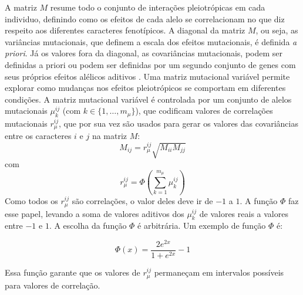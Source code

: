 A matriz $M$ resume todo o conjunto de interações pleiotrópicas em cada
individuo, definindo como os efeitos de cada alelo se correlacionam no
que diz respeito aos diferentes caracteres fenotípicos.
A diagonal da matriz $M$, ou seja, as variâncias mutacionais, que
definem a escala dos efeitos mutacionais, é definida {\it a priori}.
Já os valores fora da diagonal, as covariâncias mutacionais, podem ser
definidas a priori \citep{Jones2003, Jones2004} ou podem ser definidas
por um segundo conjunto de genes com seus próprios efeitos alélicos
aditivos \citep{Jones2007}.
Uma matriz mutacional variável permite explorar como mudanças nos
efeitos pleiotrópicos se comportam em diferentes condições.
A matriz mutacional variável é controlada por um conjunto de alelos mutacionais
$\mu^{ij}_k$ (com $k \in \{1,\ldots,m_\mu\}$), que codificam valores de
correlações mutacionais $r_\mu^{ij}$, que por sua vez são usados para gerar
os valores das covariâncias entre os caracteres $i$ e $j$ na matriz $M$:
\begin{equation}
M_{ij} = r_\mu^{ij} \sqrt {M_{ii}M_{jj}}
\end{equation}
com
\begin{equation}
r_\mu^{ij} = \Phi \left(\sum_{k=1}^{m_\mu} \mu^{ij}_k\right)
\end{equation}
Como todos os $r_\mu^{ij}$ são correlações, o valor deles deve ir de
$-1$ a $1$.
A função $\Phi$ faz esse papel, levando a soma de valores
aditivos dos $\mu^{ij}_k$ de valores reais a valores entre $-1$ e $1$.
A escolha da função $\Phi$ é arbitrária.
Um exemplo de função $\Phi$ \citep[usado em][]{Jones2007} é:

\begin{equation}
\Phi (x) = \frac{2e^{2x}}{1+e^{2x}} - 1
\end{equation}

Essa função garante que os valores de $r_\mu^{ij}$ permaneçam em
intervalos possíveis para valores de correlação.

